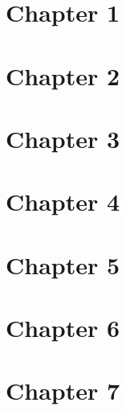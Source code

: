 \documentclass{wileySix}
\begin{document}

\chapter{Chapter 1}


















\chapter{Chapter 2}



\chapter{Chapter 3}

%

\chapter{Chapter 4}

%

\chapter{Chapter 5}

%

\chapter{Chapter 6}

%

\chapter{Chapter 7}

%
\end{document}
